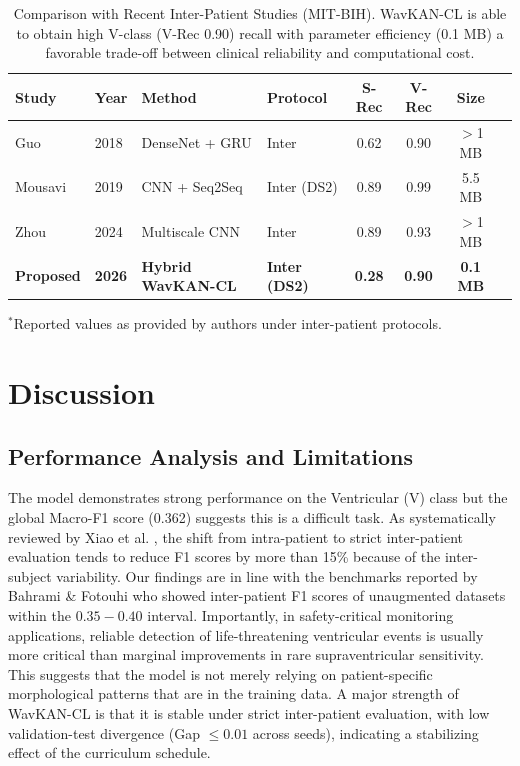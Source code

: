 \documentclass[pdflatex,sn-mathphys-num]{sn-jnl}
\theoremstyle{thmstyleone}
\theoremstyle{thmstyletwo}
\theoremstyle{thmstylethree}
\begin{document}
\begin{table}[ht]
\caption{Comparison with Recent Inter-Patient Studies (MIT-BIH). WavKAN-CL is able to obtain high V-class (V-Rec 0.90) recall with parameter efficiency (0.1 MB) a favorable trade-off between clinical reliability and computational cost.}
\label{tab:sota_comparison}
\centering
\footnotesize
\begin{tabular}{@{}llp{2.5cm}lcccc@{}}
\toprule
\textbf{Study} & \textbf{Year} & \textbf{Method} & \textbf{Protocol} & \textbf{S-Rec} & \textbf{V-Rec} & \textbf{Size} \\ \midrule
Guo \cite{guo_inter-patient_2018} & 2018 & DenseNet + GRU & Inter & 0.62 & 0.90 & $>$1 MB \\
Mousavi \cite{mousavi_inter-_2019} & 2019 & CNN + Seq2Seq & Inter (DS2) & 0.89 & 0.99 & 5.5 MB \\
Zhou \cite{zhou_inter-patient_2024} & 2024 & Multiscale CNN & Inter & 0.89 & 0.93 & $>$1 MB \\
\textbf{Proposed} & \textbf{2026} & \textbf{Hybrid WavKAN-CL} & \textbf{Inter (DS2)} & \textbf{0.28} & \textbf{0.90} & \textbf{0.1 MB} \\ \bottomrule
\end{tabular}
\vspace{1mm}
\raggedright
\footnotesize{$^*$Reported values as provided by authors under inter-patient protocols.}
\end{table}

\section{Discussion}
\label{sec:discussion}

\subsection{Performance Analysis and Limitations}
The model demonstrates strong performance on the Ventricular (V) class but the global Macro-F1 score (0.362) suggests this is a difficult task. As systematically reviewed by Xiao et al. \cite{xiao_deep_2023}, the shift from intra-patient to strict inter-patient evaluation tends to reduce F1 scores by more than 15\% because of the inter-subject variability. Our findings are in line with the benchmarks reported by Bahrami \& Fotouhi \cite{bahrami_investigation_2025} who showed inter-patient F1 scores of unaugmented datasets within the $0.35 - 0.40$ interval. Importantly, in safety-critical monitoring applications, reliable detection of life-threatening ventricular events is usually more critical than marginal improvements in rare supraventricular sensitivity. This suggests that the model is not merely relying on patient-specific morphological patterns that are in the training data. A major strength of WavKAN-CL is that it is stable under strict inter-patient evaluation, with low validation-test divergence (Gap $\le 0.01$ across seeds), indicating a stabilizing effect of the curriculum schedule.
\end{document}
